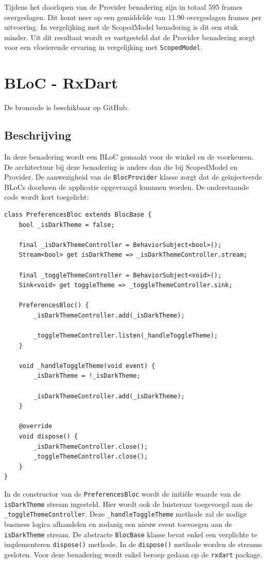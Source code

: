 Tijdens het doorlopen van de Provider benadering zijn in totaal 595 frames overgeslagen. Dit komt neer op een gemiddelde van 11.90 overgeslagen frames per uitvoering. In vergelijking met de ScopedModel benadering is dit een stuk minder. Uit dit resultaat wordt er vastgesteld dat de Provider benadering zorgt voor een vloeierende ervaring in vergelijking met \verb|ScopedModel|.

\section{BLoC - RxDart}
De broncode is beschikbaar op GitHub. \autocite{DeVrient2019c}
\subsection{Beschrijving}
In deze benadering wordt een BLoC gemaakt voor de winkel en de voorkeuren. De architectuur bij deze benadering is anders dan die bij ScopedModel en Provider. 
De aanwezigheid van de \verb|BlocProvider| klasse zorgt dat de geïnjecteerde BLoCs doorheen de applicatie opgevraagd kunnnen worden. \newline \newline
De onderstaande code wordt kort toegelicht:

\begin{verbatim}
class PreferencesBloc extends BlocBase {
    bool _isDarkTheme = false;
    
    final _isDarkThemeController = BehaviorSubject<bool>();
    Stream<bool> get isDarkTheme => _isDarkThemeController.stream;
    
    final _toggleThemeController = BehaviorSubject<void>();
    Sink<void> get toggleTheme => _toggleThemeController.sink;
    
    PreferencesBloc() {
        _isDarkThemeController.add(_isDarkTheme);
    
        _toggleThemeController.listen(_handleToggleTheme);
    }
    
    void _handleToggleTheme(void event) {
        _isDarkTheme = !_isDarkTheme;
    
        _isDarkThemeController.add(_isDarkTheme);
    }
    
    @override
    void dispose() {
        _isDarkThemeController.close();
        _toggleThemeController.close();
    }
}
\end{verbatim}
In de constructor van de \verb|PreferencesBloc| wordt de initiële waarde van de \verb|isDarkTheme| stream ingesteld. Hier wordt ook de luisteraar toegevoegd aan de \verb|_toggleThemeController|. Deze \verb|_handleToggleTheme| methode zal de nodige business logica afhandelen en zodanig een nieuw event toevoegen aan de \verb|isDarkTheme| stream.
De abstracte \verb|BlocBase| klasse bevat enkel een verplichte te implementeren \verb|dispose()| methode. In de \verb|dispose()| methode worden de streams gesloten. \newline \newline
Voor deze benadering wordt enkel beroep gedaan op de \verb|rxdart| package. 

